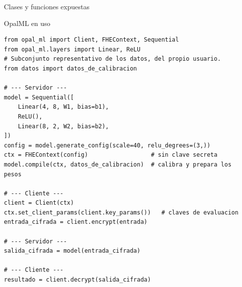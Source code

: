 \begin{frame}{Clases y funciones expuestas}
\begin{center}
    \end{center}
\end{frame}

\begin{frame}[fragile]{OpalML en uso}
\begin{lstlisting}[basicstyle=\ttfamily\fontsize{6.5}{7.1}\selectfont]
from opal_ml import Client, FHEContext, Sequential
from opal_ml.layers import Linear, ReLU
# Subconjunto representativo de los datos, del propio usuario.
from datos import datos_de_calibracion

# --- Servidor ---
model = Sequential([
    Linear(4, 8, W1, bias=b1),
    ReLU(),
    Linear(8, 2, W2, bias=b2),
])
config = model.generate_config(scale=40, relu_degrees=(3,))
ctx = FHEContext(config)                  # sin clave secreta
model.compile(ctx, datos_de_calibracion)  # calibra y prepara los pesos

# --- Cliente ---
client = Client(ctx)
ctx.set_client_params(client.key_params())   # claves de evaluacion
entrada_cifrada = client.encrypt(entrada)

# --- Servidor ---
salida_cifrada = model(entrada_cifrada)

# --- Cliente ---
resultado = client.decrypt(salida_cifrada)
\end{lstlisting}
\end{frame}

